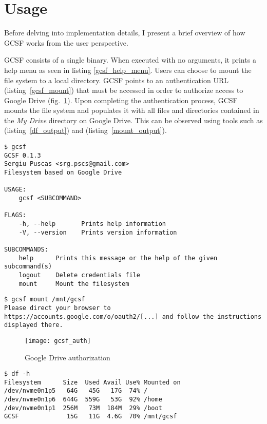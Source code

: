 \section{Usage}

Before delving into implementation details, I present a brief overview of how GCSF works from the user perspective.

GCSF consists of a single binary. When executed with no arguments, it prints a help menu as seen in listing \ref{gcsf_help_menu}. Users can choose to mount the file system to a local directory. GCSF points to an authentication URL (listing~\ref{gcsf_mount}) that must be accessed in order to authorize access to Google Drive (fig.~\ref{fig:drive_auth}). Upon completing the authentication process, GCSF mounts the file system and populates it with all files and directories contained in the \emph{My Drive} directory on Google Drive. This can be observed using tools such as  (listing~\ref{df_output}) and  (listing~\ref{mount_output}).

\begin{lstlisting}[basicstyle=\footnotesize\ttfamily,caption=GCSF help menu,frame=single,label=gcsf_help_menu,float]
$ gcsf
GCSF 0.1.3
Sergiu Puscas <srg.pscs@gmail.com>
Filesystem based on Google Drive

USAGE:
    gcsf <SUBCOMMAND>

FLAGS:
    -h, --help       Prints help information
    -V, --version    Prints version information

SUBCOMMANDS:
    help      Prints this message or the help of the given subcommand(s)
    logout    Delete credentials file
    mount     Mount the filesystem
\end{lstlisting}

\begin{lstlisting}[basicstyle=\footnotesize\ttfamily,caption=GCSF mount,frame=single,label=gcsf_mount,float]
$ gcsf mount /mnt/gcsf
Please direct your browser to https://accounts.google.com/o/oauth2/[...] and follow the instructions displayed there.
\end{lstlisting}

\begin{figure}[bpt]
\centering
\texttt{[image: gcsf\_auth]}
\caption{Google Drive authorization}
\label{fig:drive_auth}
\end{figure}

\begin{lstlisting}[basicstyle=\footnotesize\ttfamily,caption=Size and capacity of mounted filesystems,frame=single,label=df_output,float]
$ df -h
Filesystem      Size  Used Avail Use% Mounted on
/dev/nvme0n1p5   64G   45G   17G  74% /
/dev/nvme0n1p6  644G  559G   53G  92% /home
/dev/nvme0n1p1  256M   73M  184M  29% /boot
GCSF             15G   11G  4.6G  70% /mnt/gcsf
\end{lstlisting}

